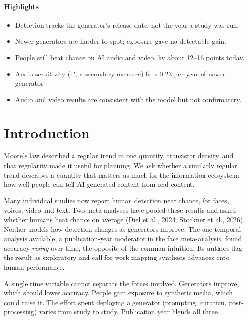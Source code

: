 \documentclass[11pt]{article}
\providecommand{\tightlist}{\setlength{\itemsep}{0pt}\setlength{\parskip}{0pt}}
\begin{document}
\paragraph{Highlights}
\begin{itemize}
\tightlist
\item
  Detection tracks the generator's release date, not the year a study
  was run.
\item
  Newer generators are harder to spot; exposure gave no detectable gain.
\item
  People still beat chance on AI audio and video, by about 12--16 points
  today.
\item
  Audio sensitivity (d′, a secondary measure) falls 0.23 per year of
  newer generator.
\item
  Audio and video results are consistent with the model but not
  confirmatory.
\end{itemize}

\hypertarget{introduction}{%
\section{Introduction}\label{introduction}}

Moore's law described a regular trend in one quantity, transistor
density, and that regularity made it useful for planning. We ask whether
a similarly regular trend describes a quantity that matters as much for
the information ecosystem: how well people can tell AI-generated content
from real content.

Many individual studies now report human detection near chance, for
faces, voices, video and text. Two meta-analyses have pooled these
results and asked whether humans beat chance on average
(\href{https://www.sciencedirect.com/science/article/pii/S2451958824001714}{Diel
et al., 2024};
\href{https://www.sciencedirect.com/science/article/pii/S2949882126000848}{Stockner
et al., 2026}). Neither models how detection changes as generators
improve. The one temporal analysis available, a publication-year
moderator in the face meta-analysis, found accuracy \emph{rising} over
time, the opposite of the common intuition. Its authors flag the result
as exploratory and call for work mapping synthesis advances onto human
performance.

A single time variable cannot separate the forces involved. Generators
improve, which should lower accuracy. People gain exposure to synthetic
media, which could raise it. The effort spent deploying a generator
(prompting, curation, post-processing) varies from study to study.
Publication year blends all three.
\end{document}
